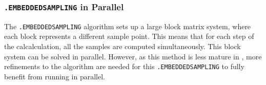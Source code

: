 \subsubsection{\texttt{.EMBEDDEDSAMPLING} in Parallel}
The \texttt{.EMBEDDEDSAMPLING} algorithm sets up a large block matrix system, 
where each block represents a different sample point.  This means that for each 
step of the calcalculation, all the samples are computed simultaneously.  This block system 
can be solved in parallel.   However, as this method is  less mature in \Xyce{}, 
more refinements to the algorithm are needed for this
\texttt{.EMBEDDEDSAMPLING} to fully benefit from running in parallel.

\clearpage

